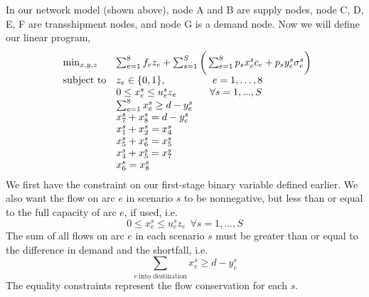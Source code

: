 \documentclass[12pt, oneside]{article}
\begin{document}
In our network model (shown above), node A and B are supply nodes, node C, D, E, F are transshipment nodes, and node G is a demand node. Now we will define our linear program,
\begin{equation*}
\begin{array}{ll@{}ll}
    \min_{x,y,z}      &   \sum_{e=1}^8 f_e z_e + \sum_{s=1}^S \bigg( \sum_{e=1}^8 p_s x_e^s c_e + p_s y_e^s \sigma_e^s \bigg) \\
    \text{subject to} &   z_e \in  \{0,1\},\ \ \ \ \ \ \ \ \ \ \ \ \ \ e=1 ,\dots, 8 \\
                      & 0  \le x_e^s  \le u_e^sz_e \ \ \ \ \ \ \ \ \ \  \forall s = 1,...,S \\
                      & \sum_{e=1}^8 x_e^s  \ge d- y_e^s \\
                      & x_7^s + x_8^s = d- y_e^s \\
                      & x_1^s + x_2^s = x_4^s \\
                      & x_5^s + x_6^s = x_5^s \\
                      & x_4^s + x_5^s = x_7^s \\
                      & x_6^s         = x_8^s
\end{array}
\end{equation*}
We first have the constraint on our first-stage binary variable defined earlier. We also want the flow on arc $e$ in scenario $s$ to be nonnegative, but less than or equal to the full capacity of arc $e$, if used, i.e. 
$$0 \le x_e^s \le u_e^sz_e \ \ \forall s = 1,...,S$$ The sum of all flows on arc $e$ in each scenario $s$ must be greater than or equal to the difference in demand and the shortfall, i.e. $$\sum_{e \ \text{into destination}} x_e^s \ge d-y_e^s$$ The equality constraints represent the flow conservation for each $s$.
\end{document}
